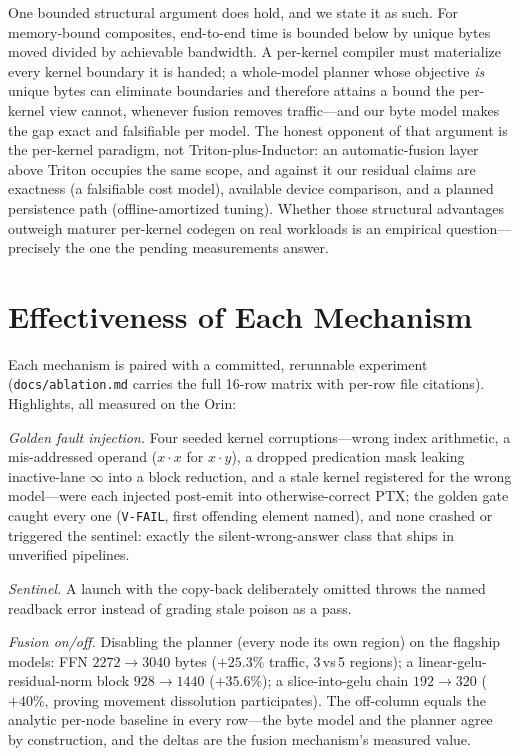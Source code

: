\documentclass[11pt]{article}
\newcommand{\code}[1]{\texttt{#1}}
\begin{document}
One bounded structural argument does hold, and we state it as such. For
memory-bound composites, end-to-end time is bounded below by unique bytes
moved divided by achievable bandwidth. A per-kernel compiler must
materialize every kernel boundary it is handed; a whole-model planner
whose objective \emph{is} unique bytes can eliminate boundaries and
therefore attains a bound the per-kernel view cannot, whenever fusion
removes traffic---and our byte model makes the gap exact and falsifiable
per model. The honest opponent of that argument is the per-kernel
paradigm, not Triton-plus-Inductor: an automatic-fusion layer above
Triton occupies the same scope, and against it our residual claims are
exactness (a falsifiable cost model), available device comparison, and a
planned persistence path (offline-amortized tuning). Whether those
structural advantages outweigh maturer per-kernel codegen on real workloads
is an empirical question---precisely the one the pending measurements answer.

\section{Effectiveness of Each Mechanism}\label{sec:ablation}
Each mechanism is paired with a committed, rerunnable experiment
(\code{docs/ablation.md} carries the full 16-row matrix with per-row
file citations). Highlights, all measured on the Orin:

\emph{Golden fault injection.} Four seeded kernel corruptions---wrong
index arithmetic, a mis-addressed operand ($x\cdot x$ for $x\cdot y$), a
dropped predication mask leaking inactive-lane $\infty$ into a block
reduction, and a stale kernel registered for the wrong model---were each
injected post-emit into otherwise-correct PTX; the golden gate caught
every one (\code{V-FAIL}, first offending element named), and none
crashed or triggered the sentinel: exactly the silent-wrong-answer class
that ships in unverified pipelines.

\emph{Sentinel.} A launch with the copy-back deliberately omitted throws
the named readback error instead of grading stale poison as a pass.

\emph{Fusion on/off.} Disabling the planner (every node its own region)
on the flagship models: FFN $2272\to3040$ bytes ($+25.3\%$ traffic,
3\,vs\,5 regions); a linear-gelu-residual-norm block $928\to1440$
($+35.6\%$); a slice-into-gelu chain $192\to320$ ($+40\%$, proving
movement dissolution participates). The off-column equals the analytic
per-node baseline in every row---the byte model and the planner agree by
construction, and the deltas are the fusion mechanism's measured value.
\end{document}

